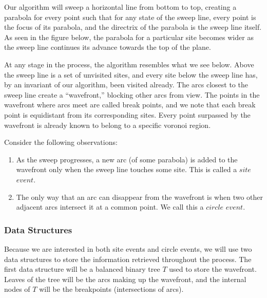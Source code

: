 \documentclass[10pt]{article}
\begin{document}
Our algorithm will sweep a horizontal line from bottom to top, creating
a parabola for every point such that for any state of the sweep line, 
every point is the focus of its parabola, and the directrix of the parabola 
is the sweep line itself.  As seen in the figure below, the parabola for a 
particular site becomes wider as the sweep line continues its advance 
towards the top of the plane.


\begin{center}
\end{center}


At any stage in the process, the algorithm resembles what we see below.
Above the sweep line is a set of unvisited sites, and every site below
the sweep line has, by an invariant of our algorithm, been visited already.  
The arcs closest to the sweep line create a ``wavefront,'' blocking other arcs
from view.  The points in the wavefront where arcs meet are called
break points, and we note that each break point is equidistant from its 
corresponding sites.  Every point surpassed by the wavefront is already known
to belong to a specific voronoi region.

\begin{center}
\end{center}


Consider the following observations:
\begin{enumerate}
\item As the sweep progresses, a new arc (of some parabola) is added to the
wavefront only when the sweep line touches some site.  This is called a 
$site$ $event$.

\item The only way that an arc can disappear from the wavefront is when two 
other adjacent arcs intersect it at a common point.  We call this a 
$circle$ $event$.
\end{enumerate}


\subsubsection{Data Structures}
Because we are interested in both site events and circle events, we will use
two data structures to store the information retrieved throughout the process.
The first data structure will be a balanced binary tree $T$ used to store
the wavefront.  Leaves of the tree will be the arcs making up the wavefront,
and the internal nodes of $T$ will be the breakpoints (intersections of arcs).
\end{document}

